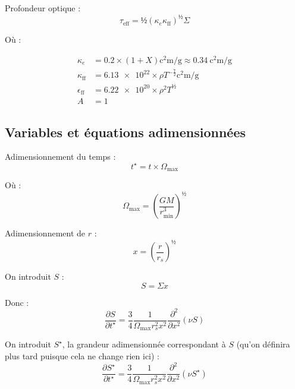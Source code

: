Profondeur optique :
\begin{equation}
    \tau_\mathrm{eff} = ½ (\kappa_e \kappa_\mathrm{ff})^½ \Sigma
\end{equation}

Où :

\begin{align}
    \kappa_e &= \num{0.2} × (1+X) \si{\square\centi\meter\per\gram} \approx \SI{0.34}{\square\centi\meter\per\gram} \\
    \kappa_\mathrm{ff} &= \num{6.13e22} × \rho T^{-\frac{7}{2}} \si{\square\centi\meter\per\gram}\\
    \epsilon_\mathrm{ff} &= \num{6.22e20} × \rho^2 T^½ \\
    A &= 1
\end{align}

\subsection{Variables et équations adimensionnées}

Adimensionnement du temps :
\begin{equation}
    t^\star = t × \Omega_\mathrm{max}
\end{equation}

Où :
\begin{equation}
    \Omega_\mathrm{max} = \left( \frac{G M}{r^3_\mathrm{min}} \right)^½
\end{equation}

Adimensionnement de $r$ :
\begin{equation}
    x = \left( \frac{r}{r_s} \right)^½
\end{equation}

On introduit $S$ :
\begin{equation}
    S = \Sigma x
\end{equation}

Donc :
\begin{equation}
    \frac{\partial S}{\partial t^\star} = \frac{3}{4} \frac{1}{\Omega_\mathrm{max} r_s^2 x^2} \frac{\partial^2}{\partial x^2} \left(\nu S\right)
\end{equation}

On introduit $S^\star$, la grandeur adimensionnée correspondant à $S$ (qu’on définira plus tard puisque cela ne change rien ici) :
\begin{equation}
    \frac{\partial S^\star}{\partial t^\star} = \frac{3}{4} \frac{1}{\Omega_\mathrm{max} r_s^2 x^2} \frac{\partial^2}{\partial x^2} \left(\nu S^\star\right)
\end{equation}

